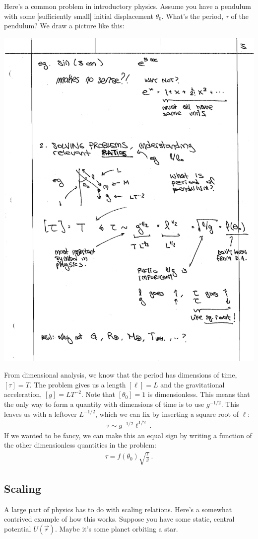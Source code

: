 Here’s a common problem in introductory physics. Assume you have a pendulum with some [sufficiently small] initial displacement $\theta_0$. What’s the period, $\tau$ of the pendulum? We draw a picture like this:

\begin{center}
\includegraphics[width=.4\textwidth]{figures/lec01_pendulum.pdf}
\end{center}

From dimensional analysis, we know that the period has dimensions of time, $[\tau] = T$. The problem gives us a length $[\ell]=L$ and the gravitational acceleration, $[g]=LT^{-2}$. Note that $[\theta_0] = 1$ is dimensionless. This means that the only way to form a quantity with dimensions of time is to use $g^{-1/2}$. This leaves us with a leftover $L^{-1/2}$, which we can fix by inserting a square root of $\ell$:
\begin{align}
  \tau \sim g^{-1/2} \ell^{1/2} \ .
\end{align}
If we wanted to be fancy, we can make this an equal sign by writing a function of the other dimensionless quantities in the problem:
\begin{align}
  \tau = f(\theta_0) \sqrt{\frac{\ell}{g}} \ .
\end{align}

\subsection{Scaling}

A large part of physics has to do with scaling relations. Here’s a somewhat contrived example of how this works. Suppose you have some static, central potential $U(\vec r)$. Maybe it’s some planet orbiting a star. 

